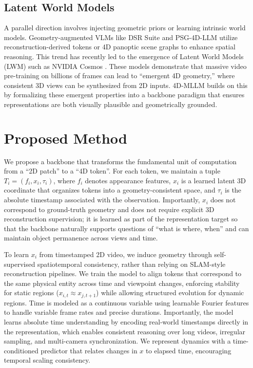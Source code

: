 \documentclass[12pt]{article}
\begin{document}
\subsection{Latent World Models}
A parallel direction involves injecting geometric priors or learning intrinsic world models. Geometry-augmented VLMs like DSR Suite \cite{zhou2025learningreason4ddynamic} and PSG-4D-LLM \cite{yang20244dpanopticscenegraph} utilize reconstruction-derived tokens or 4D panoptic scene graphs to enhance spatial reasoning. This trend has recently led to the emergence of Latent World Models (LWM) such as NVIDIA Cosmos \cite{nvidia2025worldsimulationvideofoundation}. These models demonstrate that massive video pre-training on billions of frames can lead to ``emergent 4D geometry,'' where consistent 3D views can be synthesized from 2D inputs. 4D-MLLM builds on this by formalizing these emergent properties into a backbone paradigm that ensures representations are both visually plausible and geometrically grounded.

\section{Proposed Method}
\label{sec:methodology}

We propose a backbone that transforms the fundamental unit of computation from a ``2D patch'' to a ``4D token''. For each token, we maintain a tuple $T_i = (f_i, x_i, \tau_i)$, where $f_i$ denotes appearance features, $x_i$ is a learned latent 3D coordinate that organizes tokens into a geometry-consistent space, and $\tau_i$ is the absolute timestamp associated with the observation. Importantly, $x_i$ does not correspond to ground-truth geometry and does not require explicit 3D reconstruction supervision; it is learned as part of the representation target so that the backbone naturally supports questions of ``what is where, when'' and can maintain object permanence across views and time.

To learn $x_i$ from timestamped 2D video, we induce geometry through self-supervised spatiotemporal consistency, rather than relying on SLAM-style reconstruction pipelines. We train the model to align tokens that correspond to the same physical entity across time and viewpoint changes, enforcing stability for static regions ($x_{i,t} \approx x_{j,t+1}$) while allowing structured evolution for dynamic regions. Time is modeled as a continuous variable using learnable Fourier features to handle variable frame rates and precise durations. Importantly, the model learns absolute time understanding by encoding real-world timestamps directly in the representation, which enables consistent reasoning over long videos, irregular sampling, and multi-camera synchronization. We represent dynamics with a time-conditioned predictor that relates changes in $x$ to elapsed time, encouraging temporal scaling consistency.
\end{document}
